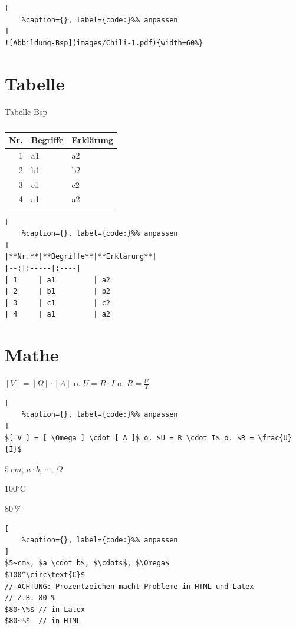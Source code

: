 \lstset{language=C}%
\begin{lstlisting}[
	%caption={}, label={code:}%% anpassen
]
![Abbildung-Bsp](images/Chili-1.pdf){width=60%}
\end{lstlisting}

\section{Tabelle}\label{tabelle}

Tabelle-Bsp %

\begin{table}[!ht]%
\centering 
	\caption{}%
\begin{tabular}{@{}rll@{}}
\toprule
\textbf{Nr.} & \textbf{Begriffe} & \textbf{Erklärung}\\
\midrule
1 & a1 & a2\\
2 & b1 & b2\\
3 & c1 & c2\\
4 & a1 & a2\\
\bottomrule
\end{tabular} 
\end{table}

\lstset{language=C}%
\begin{lstlisting}[
	%caption={}, label={code:}%% anpassen
]
|**Nr.**|**Begriffe**|**Erklärung**|
|--:|:-----|:----|
| 1     | a1         | a2          
| 2     | b1         | b2          
| 3     | c1         | c2          
| 4     | a1         | a2          
\end{lstlisting}

\section{Mathe}\label{mathe}

$[ V ] = [ \Omega ] \cdot [ A ]$ o. $U = R \cdot I$ o.
$R = \frac{U}{I}$

\lstset{language=C}%
\begin{lstlisting}[
	%caption={}, label={code:}%% anpassen
]
$[ V ] = [ \Omega ] \cdot [ A ]$ o. $U = R \cdot I$ o. $R = \frac{U}{I}$
\end{lstlisting}

$5~cm$, $a \cdot b$, $\cdots$, $\Omega$

$100^\circ\text{C}$

$80~\%$

\lstset{language=C}%
\begin{lstlisting}[
	%caption={}, label={code:}%% anpassen
]
$5~cm$, $a \cdot b$, $\cdots$, $\Omega$
$100^\circ\text{C}$  
// ACHTUNG: Prozentzeichen macht Probleme in HTML und Latex 
// Z.B. 80 %
$80~\%$ // in Latex
$80~%$  // in HTML
\end{lstlisting}

